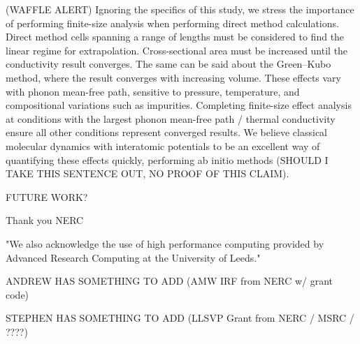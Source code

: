 \documentclass[%
preprint,                                  %
nofootinbib,
 amsmath,amssymb,
 aps,
]{revtex4-1}
\begin{document}
(WAFFLE ALERT) Ignoring the specifics of this study, we stress the importance of performing finite-size analysis when performing direct method calculations.  Direct method cells spanning a range of lengths must be considered to find the linear regime for extrapolation. Cross-sectional area must be increased until the conductivity result converges. The same can be said about the Green--Kubo method, where the result converges with increasing volume. These effects vary with phonon mean-free path, sensitive to pressure, temperature, and compositional variations such as impurities. Completing finite-size effect analysis at conditions with the largest phonon mean-free path / thermal conductivity ensure all other conditions represent converged results. We believe classical molecular dynamics with interatomic potentials to be an excellent way of quantifying these effects quickly, performing ab initio methods (SHOULD I TAKE THIS SENTENCE OUT, NO PROOF OF THIS CLAIM).

FUTURE WORK?

\begin{acknowledgements}
Thank you NERC

"We also acknowledge the use of high performance computing provided by Advanced Research Computing at the University of Leeds."

ANDREW HAS SOMETHING TO ADD (AMW IRF from NERC w/ grant code)

STEPHEN HAS SOMETHING TO ADD (LLSVP Grant from NERC / MSRC / ????)
\end{acknowledgements}


\end{document}
